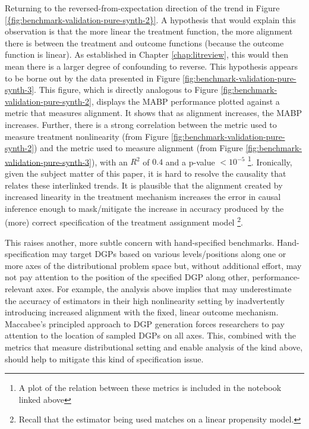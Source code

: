 \documentclass[../main.tex]{subfiles}
\begin{document}
Returning to the reversed-from-expectation direction of the trend in Figure \ref{{fig:benchmark-validation-pure-synth-2}}. A hypothesis that would explain this observation is that the more linear the treatment function, the more alignment there is between the treatment and outcome functions (because the outcome function is linear). As established in Chapter \ref{chap:litreview}, this would then mean there is a larger degree of confounding to reverse. This hypothesis appears to be borne out by the data presented in Figure \ref{fig:benchmark-validation-pure-synth-3}. This figure, which is directly analogous to Figure \ref{fig:benchmark-validation-pure-synth-2}, displays the MABP performance plotted against a metric that measures alignment. It shows that as alignment increases, the MABP increases. Further, there is a strong correlation between the metric used to measure treatment nonlinearity (from Figure \ref{fig:benchmark-validation-pure-synth-2}) and the metric used to measure alignment (from Figure \ref{fig:benchmark-validation-pure-synth-3}), with an $R^2$ of $0.4$ and a p-value $< 10^{-5}$ \footnote{A plot of the relation between these metrics is included in the notebook linked above}. Ironically, given the subject matter of this paper, it is hard to resolve the causality that relates these interlinked trends. It is plausible that the alignment created by increased linearity in the treatment mechanism increases the error in causal inference enough to mask/mitigate the increase in accuracy produced by the (more) correct specification of the treatment assignment model \footnote{Recall that the estimator being used matches on a linear propensity model.}.

\vspace{\baselineskip}

This raises another, more subtle concern with hand-specified benchmarks. Hand-specification may target DGPs based on various levels/positions along one or more axes of the distributional problem space but, without additional effort, may not pay attention to the position of the specified DGP along other, performance-relevant axes. For example, the analysis above implies that \textcite{Diamond2013GeneticStudies} may underestimate the accuracy of estimators in their high nonlinearity setting by inadvertently introducing increased alignment with the fixed, linear outcome mechanism. Maccabee's principled approach to DGP generation forces researchers to pay attention to the location of sampled DGPs on all axes. This, combined with the metrics that measure distributional setting and enable analysis of the kind above, should help to mitigate this kind of specification issue.
\end{document}
